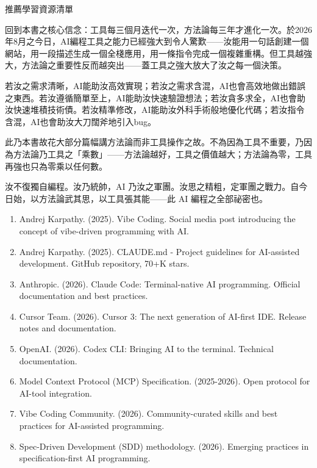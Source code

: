 \begin{center}\small\color{gray}推薦學習資源清單\end{center}


回到本書之核心信念：工具每三個月迭代一次，方法論每三年才進化一次。於2026年8月之今日，AI編程工具之能力已經強大到令人驚歎——汝能用一句話創建一個網站，用一段描述生成一個全棧應用，用一條指令完成一個複雜重構。但工具越強大，方法論之重要性反而越突出——蓋工具之強大放大了汝之每一個決策。

若汝之需求清晰，AI能助汝高效實現；若汝之需求含混，AI也會高效地做出錯誤之東西。若汝遵循簡單至上，AI能助汝快速驗證想法；若汝貪多求全，AI也會助汝快速堆積技術債。若汝精準修改，AI能助汝外科手術般地優化代碼；若汝指令含混，AI也會助汝大刀闊斧地引入bug。

此乃本書故花大部分篇幅講方法論而非工具操作之故。不為因為工具不重要，乃因為方法論乃工具之「乘數」——方法論越好，工具之價值越大；方法論為零，工具再強也只為零乘以任何數。

汝不復獨自編程。汝乃統帥，AI 乃汝之軍團。汝思之精粗，定軍團之戰力。自今日始，以方法論武其思，以工具張其能——此 AI 編程之全部祕密也。


\begin{enumerate}
  \item Andrej Karpathy. (2025). Vibe Coding. Social media post introducing the concept of vibe-driven programming with AI.
  \item Andrej Karpathy. (2025). CLAUDE.md - Project guidelines for AI-assisted development. GitHub repository, 70+K stars.
  \item Anthropic. (2026). Claude Code: Terminal-native AI programming. Official documentation and best practices.
  \item Cursor Team. (2026). Cursor 3: The next generation of AI-first IDE. Release notes and documentation.
  \item OpenAI. (2026). Codex CLI: Bringing AI to the terminal. Technical documentation.
  \item Model Context Protocol (MCP) Specification. (2025-2026). Open protocol for AI-tool integration.
  \item Vibe Coding Community. (2026). Community-curated skills and best practices for AI-assisted programming.
  \item Spec-Driven Development (SDD) methodology. (2026). Emerging practices in specification-first AI programming.
\end{enumerate}
